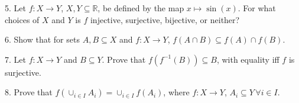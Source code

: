 \documentclass{article}
\theoremstyle{remark} %
\newcommand{\R}{{\mathbb{R}}}
\begin{document}
5.  Let $f: X \to Y$, $X,Y \subseteq \R$, be defined by the map $x \mapsto \sin(x)$. For what choices of $X$ and $Y$ is $f$ injective, surjective, bijective, or neither?

\vspace{12cm} %



6. Show that for sets $A,B \subseteq X$ and $f: X \to Y$, $f(A \cap B) \subseteq f(A) \cap f(B)$.

\vspace{11cm} %



7. Let $f: X \to Y$ and $B \subseteq Y$. Prove that $f(f^{-1}(B)) \subseteq B$, with equality iff $f$ is surjective.

\vspace{13cm} %




8. Prove that $f(\cup_{i \in I}A_i) = \cup_{i \in I}f(A_i)$, where $f:X \to Y$, $A_i \subseteq Y \, \forall i \in I$. 

\vspace{11cm} %

\end{document}
